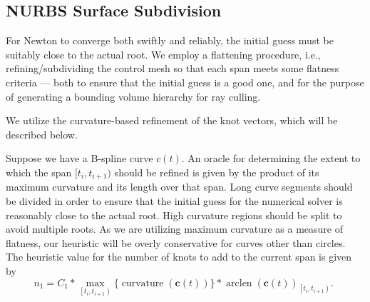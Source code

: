 \documentclass[acmtog]{acmart}
\begin{document}
\subsection{NURBS Surface Subdivision}
\hspace*{8pt}
For Newton to converge both swiftly and reliably, the initial guess must be suitably close to the actual root. We employ a flattening procedure, i.e., refining/subdividing the control mesh so that each span meets some flatness criteria — both to ensure that the initial guess is a good one, and for the purpose of generating a bounding volume hierarchy for ray culling.

We utilize the curvature-based refinement of the knot vectors, which will be described below.

Suppose we have a B-spline curve $c(t)$. An oracle for determining the extent to which the span $[t_i , t_{i+1})$ should be refined is given by the product of its maximum curvature and its length over that span. Long curve segments should be divided in order to ensure that the initial guess for the numerical solver is reasonably close to the actual root. High curvature regions should be split to avoid multiple roots. As we are utilizing maximum curvature as a measure of flatness, our heuristic will be overly conservative for curves other than circles. The heuristic value for the number of knots to add to the current span is given by
\[
    n_1=C_1 * \max _{\left[t_i, t_{i+1}\right)}\{\operatorname{curvature}(\mathbf{c}(t))\} * \operatorname{arclen}(\mathbf{c}(t))_{\left[t_i, t_{i+1}\right)} \text {. }
\]
\end{document}

